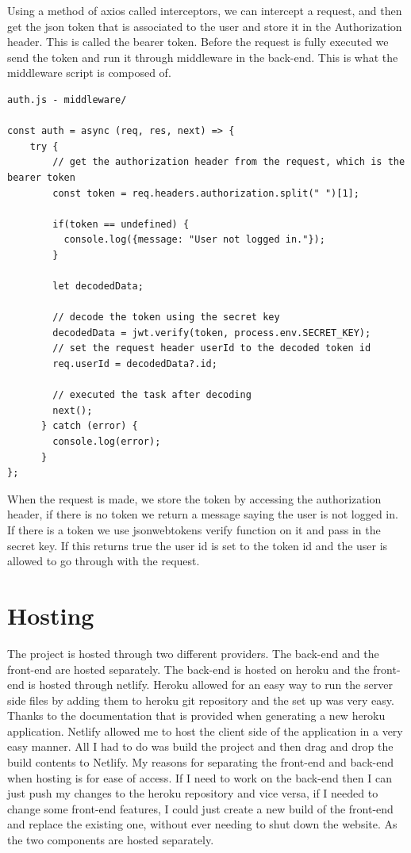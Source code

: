 Using a method of axios called interceptors, we can intercept a request, and then get the json token that is associated to the user and store it in the Authorization header. This is called the bearer token. Before the request is fully executed we send the token and run it through middleware in the back-end. This is what the middleware script is composed of.

\begin{verbatim}
auth.js - middleware/

const auth = async (req, res, next) => {
    try {
        // get the authorization header from the request, which is the bearer token
        const token = req.headers.authorization.split(" ")[1];

        if(token == undefined) {
          console.log({message: "User not logged in."});
        }

        let decodedData;
        
        // decode the token using the secret key
        decodedData = jwt.verify(token, process.env.SECRET_KEY);
        // set the request header userId to the decoded token id
        req.userId = decodedData?.id;  
    
        // executed the task after decoding
        next();
      } catch (error) {
        console.log(error);
      }
};
\end{verbatim}

When the request is made, we store the token by accessing the authorization header, if there is no token we return a message saying the user is not logged in. If there is a token we use jsonwebtokens verify function on it and pass in the secret key. If this returns true the user id is set to the token id and the user is allowed to go through with the request.

\section{Hosting}
The project is hosted through two different providers. The back-end and the front-end are hosted separately. The back-end is hosted on heroku and the front-end is hosted through netlify. Heroku allowed for an easy way to run the server side files by adding them to heroku git repository and the set up was very easy. Thanks to the documentation that is provided when generating a new heroku application. Netlify allowed me to host the client side of the application in a very easy manner. All I had to do was build the project and then drag and drop the build contents to Netlify. My reasons for separating the front-end and back-end  when hosting is for ease of access. If I need to work on the back-end then I can just push my changes to the heroku repository and vice versa, if I needed to change some front-end features, I could just create a new build of the front-end and replace the existing one, without ever needing to shut down the website. As the two components are hosted separately.

